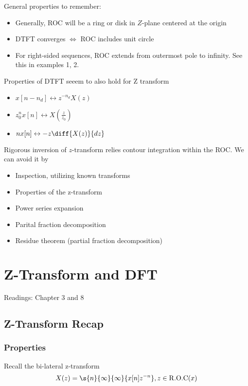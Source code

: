 \documentclass{report}
\begin{document}
General properties to remember:
\begin{itemize}
    \item Generally, ROC will be a ring or disk in $Z$-plane centered at the origin
    \item DTFT converges $\iff$ ROC includes unit circle
    \item For right-sided sequences, ROC extends from outermost pole to infinity. See this in examples 1, 2.
\end{itemize}

Properties of DTFT seeem to also hold for Z transform
\begin{itemize}
    \item $x[n - n_d] \leftrightarrow z^{-n_d} X(z)$
    \item $z_0^n x[n] \leftrightarrow X(\frac{z}{z_0})$
    \item $nx[n] \leftrightarrow -z \diff{X(z)}{dz}$
\end{itemize}

Rigorous inversion of $z$-transform relies contour integration within the ROC. We can avoid it by
\begin{itemize}
    \item Inspection, utilizing known transforms
    \item Properties of the z-transform
    \item Power series expansion
    \item Parital fraction decomposition
    \item Residue theorem (partial fraction decomposition)
\end{itemize}

\chapter{Z-Transform and DFT}
Readings: Chapter 3 and 8

\section{Z-Transform Recap}

\subsection{Properties}
Recall the bi-lateral z-transform
\begin{equation*}
    X(z) = \s{n}{\infty}{\infty}{x[n]z^{-n}}, z \in \mathrm{R.O.C}(x)
\end{equation*}
\end{document}
